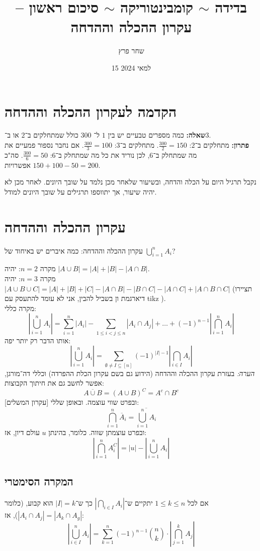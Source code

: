 \documentclass[]{article}
\author{שחר פרץ}
\title{בדידה $\sim$ קומבינטוריקה $\sim$ סיכום ראשון – עקרון ההכלה וההדחה}
\date{15 למאי 2024}
\newcommand\del   {$ \!\! $}
\newcommand\sumnko{\sum_{k = 1}^{n}}
\newcommand\sumnio{\sum_{i = 1}^{n}}
\begin{document}
	\maketitle
	\section{הקדמה לעקרון ההכלה וההדחה}
	\textbf{שאלה: }כמה מספרים טבעיים יש בין $1$ ל־ $300$ כולל שמתחלקים ב־$2$ או ב־$3$. \\
	\textbf{פתרון: }מתחלקים ב־$2$: $\frac{300}{2} = 150$. מתחלקים ב־3: $\frac{300}{3} = 100$. אם נחבר נספור פמעיים את מה שמתחלק ב־6, לכן נוריד את כל מה שמתחלק ב־6: $\frac{300}{6} = 50$. סה"כ $150 + 100 - 50 = 200$ אפשרויות. 
	
	נקבל תרגיל היום על הכלה והדחה, ובשיעור שלאחר מכן נלמד על שובך היונים. לאחר מכן לא יהיה שיעור, אך יתווספו תרגילים על שובך היונים למודל. 
	
	\section{עקרון ההכלה וההדחה}
	עקרון ההכלה וההדחה: כמה איברים יש באיחוד של $ \bigcup_{i = 1}^n A_i $?
	
	מקרה $n = 2 $: יהיה $|A \cup B| = |A| + |B| - |A \cap B|$. \\
	מקרה $n = 3 $: יהיה $ |A \cup B \cup C| = |A| + |B| + |C| - |A \cap B| - |B \cap C| - |A \cap C| + |A \cap B \cap C|$ (תציירו דיארגמת ון בשביל להבין, אני לא עומד להתעסק עם tikz \del). \\
	מקרה כללי: 
	\[ \left |\bigcup_{i = 1}^n A_i \right | = \sumnio |A_i| - \sum_{1 \le i < j \le n} |A_i \cap A_j| + \dots + (-1)^{n - 1} \left |\bigcap_{i = 1}^n A_i\right | \]
	אותו הדבר רק יותר יפה: 
	\[ \left |\bigcup_{i = 1}^n A_i \right | = \sum_{\emptyset \neq I \subseteq [n]} (-1)^{|I| - 1} \left | \bigcap_{i \in I}A_i \right | \]
	\textit{הערה: }בעזרת עקרון ההכלה וההדחה (הידוע גם בשם עקרון הכלת ההפרדה) וכללי דה־מורגן, אפשר לחשב גם את חיתוך הקבוצות: 
	\[ \overline{A\cup B} = (A \cup B)^C = A^c \cap B^c \]
	ובפרט שווי עוצמה. ובאופן שללי [עקרון המשלים]: 
	\[ \bigcap_{i = 1}^n \overline A_i = \overline{\bigcup_{i = 1}^n A_i} \]
	ובפרט עוצמתן שווה. כלומר, בהינתן $u$ עולם דיון, אז: 
	\[ \left | \bigcap_{i = 1}^n A_i^C \right | = |u| - \left | \bigcup_{i = 1}^n A_i \right | \]
	
	\subsection{המקרה הסימטרי}
	אם לכל $1 \le k \le n$ יתקיים ש־$ | \bigcap_{i \in I} A_i |$ כך ש־$|I| = k$ הוא קבוע, (כלומר $|A_i \cap A_j| = |A_k \cap A_g| $), אז: 
	\[ \left | \bigcup_{i \in I}^n A_i \right | = \sumnko (-1)^{n - 1}\binom{n}{k} \cdot \left | \bigcap_{j = 1}^k A_j \right | \]
	
\end{document}
